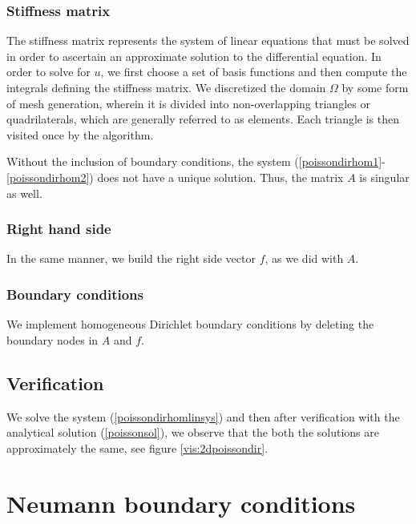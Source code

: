 \documentclass{report}
\begin{document}
\subsubsection{Stiffness matrix}

The stiffness matrix represents the system of linear equations that must be solved in order to ascertain an approximate solution to the differential equation. In order to solve for $u$, we first choose a set of basis functions and then compute the integrals defining the stiffness matrix. We discretized the domain $\Omega$ by some form of mesh generation, wherein it is divided into non-overlapping triangles or quadrilaterals, which are generally referred to as elements. Each triangle is then visited once by the algorithm.

Without the inclusion of boundary conditions, the system (\ref{poissondirhom1}-\ref{poissondirhom2}) does not have a unique solution. Thus, the matrix $A$ is singular as well.

\subsubsection{Right hand side}

In the same manner, we build the right side vector $f$, as we did with $A$.

\subsubsection{Boundary conditions}

We implement homogeneous Dirichlet boundary conditions by deleting the boundary nodes in $A$ and $f$.

\subsection{Verification}

We solve the system (\ref{poissondirhomlinsys}) and then after verification with the analytical solution (\ref{poissonsol}), we observe that the both the solutions are approximately the same, see figure \ref{vis:2dpoissondir}.

\section{Neumann boundary conditions}
\end{document}
